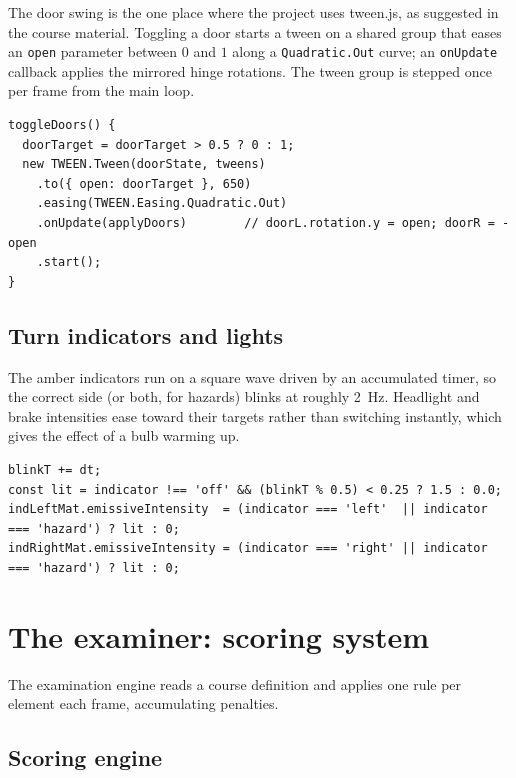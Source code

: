 \documentclass[11pt]{article}
\newcommand{\code}[1]{\texttt{#1}}
\begin{document}
The door swing is the one place where the project uses tween.js, as suggested in
the course material. Toggling a door starts a tween on a shared group that eases
an \code{open} parameter between $0$ and $1$ along a \code{Quadratic.Out} curve;
an \code{onUpdate} callback applies the mirrored hinge rotations. The tween group
is stepped once per frame from the main loop.

\begin{lstlisting}[caption={Eased door swing (\code{car.js}).}]
toggleDoors() {
  doorTarget = doorTarget > 0.5 ? 0 : 1;
  new TWEEN.Tween(doorState, tweens)
    .to({ open: doorTarget }, 650)
    .easing(TWEEN.Easing.Quadratic.Out)
    .onUpdate(applyDoors)        // doorL.rotation.y = open; doorR = -open
    .start();
}
\end{lstlisting}

\subsection{Turn indicators and lights}

The amber indicators run on a square wave driven by an accumulated timer, so the
correct side (or both, for hazards) blinks at roughly \SI{2}{Hz}. Headlight and
brake intensities ease toward their targets rather than switching instantly, which
gives the effect of a bulb warming up.

\begin{lstlisting}[caption={Indicator blink (\code{car.js}).}]
blinkT += dt;
const lit = indicator !== 'off' && (blinkT % 0.5) < 0.25 ? 1.5 : 0.0;
indLeftMat.emissiveIntensity  = (indicator === 'left'  || indicator === 'hazard') ? lit : 0;
indRightMat.emissiveIntensity = (indicator === 'right' || indicator === 'hazard') ? lit : 0;
\end{lstlisting}

\section{The examiner: scoring system}
\label{sec:examiner}

The examination engine reads a course definition and applies one rule per
element each frame, accumulating penalties.

\subsection{Scoring engine}
\end{document}
